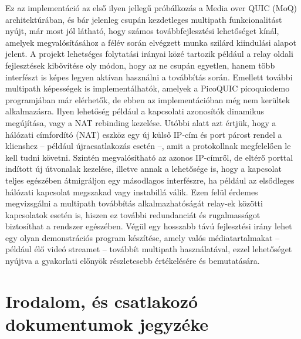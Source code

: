 \documentclass[a4paper,oneside]{article}
\begin{document}
Ez az implementáció az első ilyen jellegű próbálkozás a Media over QUIC (MoQ) architektúrában, és bár 
jelenleg csupán kezdetleges multipath funkcionalitást nyújt, már most jól látható, hogy számos továbbfejlesztési 
lehetőséget kínál, amelyek megvalósításához a félév során elvégzett munka szilárd kiindulási alapot jelent. 
A projekt lehetséges folytatási irányai közé tartozik például a relay oldali fejlesztések kibővítése oly 
módon, hogy az ne csupán egyetlen, hanem több interfészt is képes legyen aktívan használni a továbbítás 
során. Emellett további multipath képességek is implementálhatók, amelyek a PicoQUIC picoquicdemo 
programjában már elérhetők, de ebben az implementációban még nem kerültek alkalmazásra. Ilyen lehetőség 
például a kapcsolati azonosítók dinamikus megújítása, vagy a NAT rebinding kezelése. Utóbbi alatt 
azt értjük, hogy a hálózati címfordító (NAT) eszköz egy új külső IP-cím és port párost rendel a 
klienshez – például újracsatlakozás esetén –, amit a protokollnak megfelelően le kell tudni követni. 
Szintén megvalósítható az azonos IP-címről, de eltérő porttal indított új útvonalak kezelése, illetve 
annak a lehetősége is, hogy a kapcsolat teljes egészében átmigráljon egy másodlagos interfészre, ha 
például az elsődleges hálózati kapcsolat megszakad vagy instabillá válik. Ezen felül érdemes megvizsgálni a 
multipath továbbítás alkalmazhatóságát relay-ek közötti kapcsolatok esetén is, hiszen ez további 
redundanciát és rugalmasságot biztosíthat a rendszer egészében. Végül egy hosszabb távú fejlesztési 
irány lehet egy olyan demonstrációs program készítése, amely valós médiatartalmakat – például élő 
videó streamet – továbbít multipath használatával, ezzel lehetőséget nyújtva a gyakorlati előnyök 
részletesebb értékelésére és bemutatására.

\newpage
 
\section{Irodalom, és csatlakozó dokumentumok jegyzéke}
\label{sec:irod-es-csatl}
\end{document}
